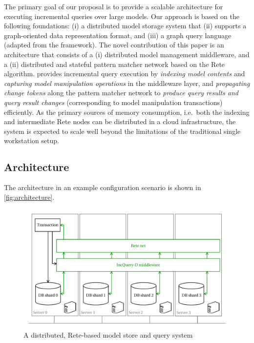 The primary goal of our proposal is to provide a scalable architecture for executing incremental queries over large models.  Our approach is based on the following foundations: (i) a distributed model storage system that (ii) supports a graph-oriented data representation format, and (iii) a graph query language (adapted from the \eiq{} framework). The novel contribution of this paper is an architecture that consists of a (i) distributed model management middleware, and a (ii) distributed and stateful pattern matcher network based on the Rete algorithm. \iqd{} provides incremental query execution by \emph{indexing model contents} and \emph{capturing model manipulation operations} in the middleware layer, and \emph{propagating change tokens} along the pattern matcher network to \emph{produce query results and query result changes} (corresponding to model manipulation transactions) efficiently. As the primary sources of memory consumption, i.e.\ both the indexing and intermediate Rete nodes can be distributed in a cloud infrastructure, the system is expected to scale well beyond the limitations of the traditional single workstation setup.

\subsection{Architecture}
\label{architecture}
The \iqd{} architecture in an example configuration scenario is shown in \autoref{fig:architecture}.

\begin{figure}[!t]
\begin{center}
\includegraphics[width=.95\columnwidth]{figures/architecture}
\caption{A distributed, Rete-based model store and query system}
\label{fig:architecture}
\end{center}
\end{figure}



